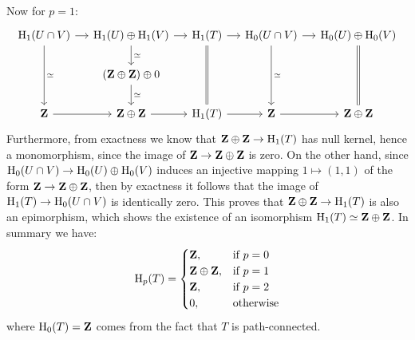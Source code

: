 \begin{example}[Torus]
\begin{enumerate}[(a)]
  Now for \(p = 1\):
  \[
  \begin{tikzcd}[column sep=small]
  \Hmlg_1(U \cap V)
  \ar[r] \ar[dd, "\dis"]
  &\Hmlg_1(U) \oplus \Hmlg_1(V)
  \ar[r] \ar[d, "\dis"]
  &\Hmlg_1(T) \ar[r]
  \ar[dd, equals]
  &\Hmlg_0(U \cap V)
  \ar[dd, "\dis"]
  \ar[r]
  &\Hmlg_0(U) \oplus \Hmlg_0(V)
  \ar[dd, equals]
  \\
  &(\Z \oplus \Z) \oplus 0
  \ar[d, "\dis"]
  &&&
  \\
  \Z
  \ar[r]
  &\Z \oplus \Z
  \ar[r]
  &\Hmlg_1(T)
  \ar[r]
  &\Z \ar[r]
  &\Z \oplus \Z
  \end{tikzcd}
  \]
  Furthermore, from exactness we know that \(\mathbf{Z} \oplus \mathbf{Z} \to \operatorname{H}_1(T)\) has null
  kernel, hence a monomorphism, since the image of \(\mathbf{Z} \to \mathbf{Z} \oplus \mathbf{Z}\) is zero. On
  the other hand, since \(\operatorname{H}_0(U \cap V) \to \operatorname{H}_0(U) \oplus \operatorname{H}_0(V)\) induces an
  injective mapping \(1 \mapsto (1, 1)\) of the form \(\mathbf{Z} \to \mathbf{Z} \oplus \mathbf{Z}\), then by
  exactness it follows that the image of \(\operatorname{H}_1(T) \to \operatorname{H}_0(U \cap V)\) is
  identically zero. This proves that \(\mathbf{Z} \oplus \mathbf{Z} \to \operatorname{H}_1(T)\) is also an
  epimorphism, which shows the existence of an isomorphism
  \(\operatorname{H}_1(T) \simeq \mathbf{Z} \oplus \mathbf{Z}\). In summary we have:
  \[
  \operatorname{H}_p(T) =
  \begin{cases}
    \mathbf{Z}, &\text{if } p = 0 \\
    \mathbf{Z} \oplus \mathbf{Z}, &\text{if } p = 1 \\
    \mathbf{Z}, &\text{if } p = 2 \\
    0, &\text{otherwise}
  \end{cases}
  \]
  where \(\operatorname{H}_0(T) = \mathbf{Z}\) comes from the fact that \(T\) is path-connected.
\end{enumerate}
\end{example}

